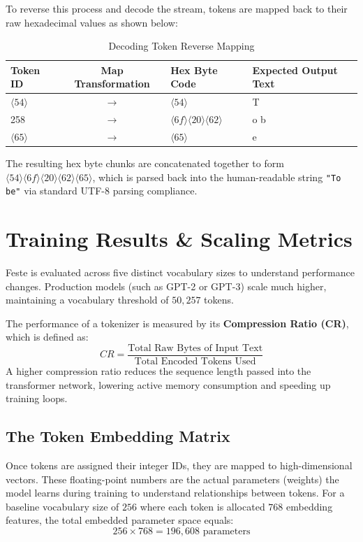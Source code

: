 \documentclass{article}
\begin{document}
To reverse this process and decode the stream, tokens are mapped back to their raw hexadecimal values as shown below:

\begin{table}[h]
\centering
\caption{Decoding Token Reverse Mapping}
\label{tab:decoding_map}
\begin{tabular}{lcll}
\toprule
\textbf{Token ID} & \textbf{Map Transformation} & \textbf{Hex Byte Code} & \textbf{Expected Output Text} \\
\midrule
$\langle 54 \rangle$ & $\rightarrow$ & $\langle 54 \rangle$ & T \\
258 & $\rightarrow$ & $\langle 6f \rangle\langle 20 \rangle\langle 62 \rangle$ & o b \\
$\langle 65 \rangle$ & $\rightarrow$ & $\langle 65 \rangle$ & e \\
\bottomrule
\end{tabular}
\end{table}

The resulting hex byte chunks are concatenated together to form $\langle 54 \rangle\langle 6f \rangle\langle 20 \rangle\langle 62 \rangle\langle 65 \rangle$, which is parsed back into the human-readable string \texttt{"To be"} via standard UTF-8 parsing compliance.

\section{Training Results \& Scaling Metrics}
Feste is evaluated across five distinct vocabulary sizes to understand performance changes. Production models (such as GPT-2 or GPT-3) scale much higher, maintaining a vocabulary threshold of $50,257$ tokens.

The performance of a tokenizer is measured by its \textbf{Compression Ratio (CR)}, which is defined as:
\begin{equation}
    CR = \frac{\text{Total Raw Bytes of Input Text}}{\text{Total Encoded Tokens Used}}
\end{equation}
A higher compression ratio reduces the sequence length passed into the transformer network, lowering active memory consumption and speeding up training loops.

\subsection{The Token Embedding Matrix}
Once tokens are assigned their integer IDs, they are mapped to high-dimensional vectors. These floating-point numbers are the actual parameters (weights) the model learns during training to understand relationships between tokens. For a baseline vocabulary size of $256$ where each token is allocated $768$ embedding features, the total embedded parameter space equals:
\begin{equation*}
    256 \times 768 = 196,608 \text{ parameters}
\end{equation*}
\end{document}
